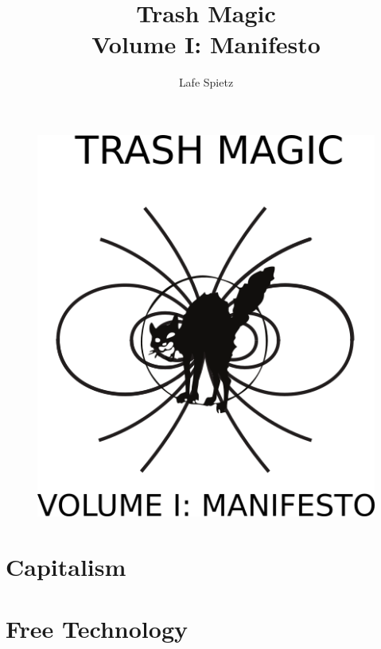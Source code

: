 \documentclass[ebook,12pt,openany,onesided]{memoir} %
\title{Trash Magic \\ Volume I: Manifesto}
\author{Lafe Spietz}
\begin{document}
\frontmatter
\begin{figure}[htbp]
\centering
\includegraphics{images/frontcover.png}
\end{figure}

\clearpage

\clearpage



\newpage
\thispagestyle{empty}
\mbox{}



\maketitle

\tableofcontents

\listoffigures 

\mainmatter
\chapter{Capitalism}

\newpage


\chapter{Free Technology}

\newpage

\end{document}

